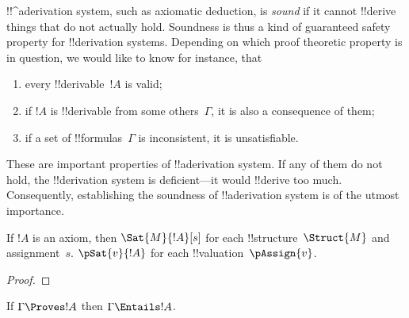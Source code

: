 \documentclass[../../../include/open-logic-section]{subfiles}
\begin{document}
      {}
      {}

\begin{explain}
!!^a{derivation} system, such as axiomatic deduction, is \emph{sound}
if it cannot !!{derive} things that do not actually hold.  Soundness is
thus a kind of guaranteed safety property for !!{derivation} systems.
Depending on which proof theoretic property is in question, we would
like to know for instance, that
\begin{enumerate}
\item every !!{derivable}~$!A$ is valid;
\item if $!A$ is !!{derivable} from some others~$\Gamma$, it is also a
  consequence of them;
\item if a set of !!{formula}s~$\Gamma$ is inconsistent, it is
  unsatisfiable.
\end{enumerate}
These are important properties of !!a{derivation} system.  If any of them do
not hold, the !!{derivation} system is deficient---it would !!{derive} too much.
Consequently, establishing the soundness of !!a{derivation} system is of the
utmost importance.
\end{explain}

\begin{prop}
  If $!A$ is an axiom, then
    {$\Sat{M}{!A}[s]$ for each !!{structure}~$\Struct{M}$ and assignment~$s$.}
    {$\pSat{v}{!A}$ for each !!{valuation}~$\pAssign{v}$.}
\end{prop}

\begin{proof}
\end{proof}

\begin{thm}[Soundness]
If $\Gamma \Proves !A$ then $\Gamma \Entails !A$.
\end{thm}
\end{document}
